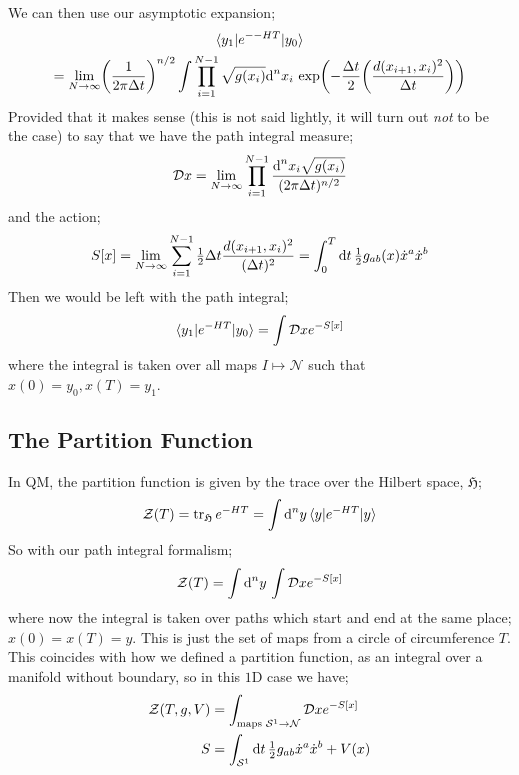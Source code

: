 We can then use our asymptotic expansion;
\begin{multline*}
\bra{y_1}e^{--HT}\ket{y_0} \\ = \lim_{N \rightarrow \infty} \left(\frac{1}{2\pi \Delta t}\right)^{n/2}\int{\prod_{i = 1}^{N - 1}{\sqrt{g(x_i)}\upd{^n x_i}}\exp\left(-\frac{\Delta t}{2}\left(\frac{d(x_{i + 1}, x_{i})^2}{\Delta t}\right)\right)}
\end{multline*}
Provided that it makes sense (this is not said lightly, it will turn out \emph{not} to be the case) to say that we have the path integral measure;
\begin{equation*}
\mathcal{D} x = \lim_{N \rightarrow \infty}\prod_{i = 1}^{N - 1}{\frac{\text{d}^n x_i \sqrt{g(x_i)}}{(2\pi \Delta t)^{n/2}}} 
\end{equation*}
and the action;
\begin{equation*}
S[x] = \lim_{N \rightarrow \infty}\sum_{i = 1}^{N - 1}{\tfrac{1}{2}\Delta t \frac{d(x_{i + 1}, x_{i})^2}{(\Delta t)^2}} = \int_0^{T}{\text{d}t \,\tfrac{1}{2}g_{ab}(x)\dot{x}^{a}\dot{x}^{b}}
\end{equation*}
Then we would be left with the path integral;
\begin{equation}
\bra{y_1}e^{-HT}\ket{y_0} = \int{\mD x e^{-S[x]}}
\end{equation}
where the integral is taken over all maps $I \mapsto \mathcal{N}$ such that $x(0) = y_0, x(T) = y_1$. 
\subsection{The Partition Function}
In QM, the partition function is given by the trace over the Hilbert space, $\mathfrak{H}$;
\begin{equation}
\mZ(T) = \tr_{\mathfrak{H}}e^{-HT} = \int{\upd{^n y} \bra{y}e^{-HT}\ket{y}}
\end{equation}
So with our path integral formalism;
\begin{equation*}
\mathcal{Z}(T) = \int{\text{d}^n y \,\int{\mathcal{D}x e^{-S[x]}}}
\end{equation*}
where now the integral is taken over paths which start and end at the same place; $x(0) = x(T) = y$. This is just the set of maps from a circle of circumference $T$. This coincides with how we defined a partition function, as an integral over a manifold without boundary, so in this $1$D case we have;
\begin{align*}
\mathcal{Z}(T, g, V) &= \int_{\text{maps }\mathcal{S}^1 \rightarrow \mathcal{N}}{\mathcal{D} x e^{-S[x]}} \\
S &= \int_{\mathcal{S}^1}{\text{d}t \,\tfrac{1}{2}g_{ab}\dot{x}^{a}\dot{x}^{b} + V(x)}
\end{align*}
